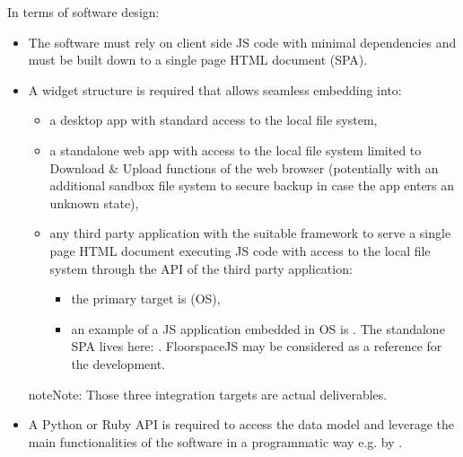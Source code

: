 \documentclass[letterpaper,10pt, openany,english]{sphinxmanual}
\begin{document}
In terms of software design:
\begin{itemize}
\item {} 
The software must rely on client side JS code with minimal dependencies and must be built down to a single page HTML document (SPA).

\item {} 
A widget structure is required that allows seamless embedding into:
\begin{itemize}
\item {} 
a desktop app \textendash{} with standard access to the local file system,

\item {} 
a standalone web app \textendash{} with access to the local file system limited to Download \& Upload functions of the web browser (potentially with an additional sandbox file system to secure backup in case the app enters an unknown state),

\item {} 
any third party application with the suitable framework to serve a single page HTML document executing JS code \textendash{} with access to the local file system through the API of the third party application:
\begin{itemize}
\item {} 
the primary target is  (OS),

\item {} 
an example of a JS application embedded in OS is . The standalone SPA lives here: . FloorspaceJS may be considered as a reference for the development.

\end{itemize}

\end{itemize}

\begin{sphinxadmonition}{note}{Note:}
Those three integration targets are actual deliverables.
\end{sphinxadmonition}

\item {} 
A Python or Ruby API is required to access the data model and leverage the main functionalities of the software in a programmatic way e.g. by .

\end{itemize}
\end{document}
